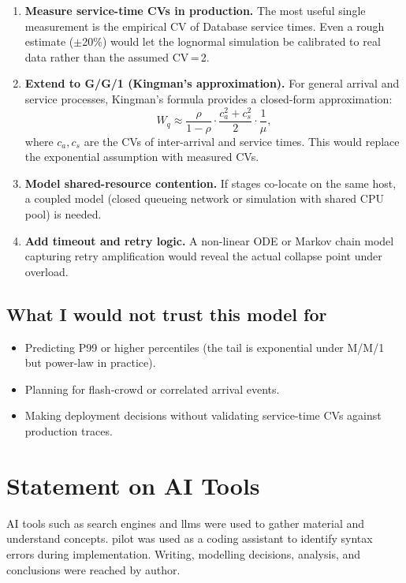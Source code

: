 \documentclass[12pt,a4paper]{article}
\begin{document}
\begin{enumerate}
  \item \textbf{Measure service-time CVs in production.} The most useful single measurement
    is the empirical CV of Database service times. Even a rough estimate ($\pm$20\%)
    would let the lognormal simulation be calibrated to real data rather than the assumed
    CV\,=\,2.
  \item \textbf{Extend to G/G/1 (Kingman's approximation).} For general arrival and service
    processes, Kingman's formula provides a closed-form approximation:
    \[
      W_q \approx \frac{\rho}{1-\rho}\cdot\frac{c_a^2 + c_s^2}{2} \cdot \frac{1}{\mu},
    \]
    where $c_a, c_s$ are the CVs of inter-arrival and service times. This would replace
    the exponential assumption with measured CVs.
  \item \textbf{Model shared-resource contention.} If stages co-locate on the same host,
    a coupled model (closed queueing network or simulation with shared CPU pool) is needed.
  \item \textbf{Add timeout and retry logic.} A non-linear ODE or Markov chain model
    capturing retry amplification would reveal the actual collapse point under overload.
\end{enumerate}

\subsection{What I would not trust this model for}

\begin{itemize}
  \item Predicting P99 or higher percentiles (the tail is exponential under M/M/1 but
    power-law in practice).
  \item Planning for flash-crowd or correlated arrival events.
  \item Making deployment decisions without validating service-time CVs against production
    traces.
\end{itemize}

\section*{Statement on AI Tools}

AI tools such as search engines and llms were used to gather material and understand concepts. pilot was used as a coding assistant to identify syntax errors during
implementation. Writing, modelling decisions, analysis, and conclusions were reached by author.
\end{document}
